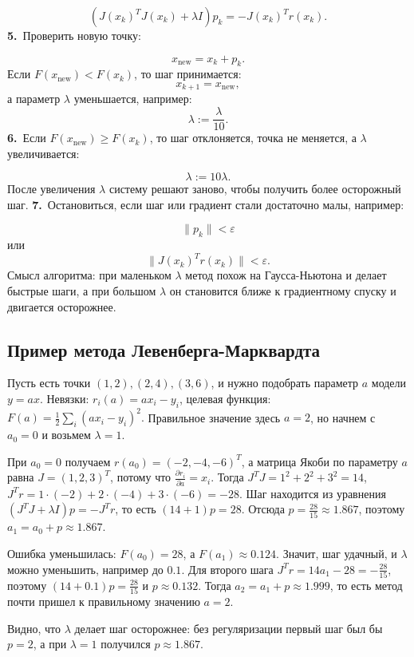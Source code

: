 \documentclass[12pt,a4paper]{article}
\begin{document}
\[
\left(J(x_k)^TJ(x_k)+\lambda I\right)p_k=-J(x_k)^Tr(x_k).
\]
\noindent\textbf{5.}\ Проверить новую точку:\par
\[
x_{\text{new}}=x_k+p_k.
\]
Если $F(x_{\text{new}})<F(x_k)$, то шаг принимается:
\[
x_{k+1}=x_{\text{new}},
\]
а параметр $\lambda$ уменьшается, например:
\[
\lambda:=\frac{\lambda}{10}.
\]
\noindent\textbf{6.}\ Если $F(x_{\text{new}})\ge F(x_k)$, то шаг отклоняется, точка не меняется, а $\lambda$ увеличивается:\par
\[
\lambda:=10\lambda.
\]
После увеличения $\lambda$ систему решают заново, чтобы получить более осторожный шаг.
\noindent\textbf{7.}\ Остановиться, если шаг или градиент стали достаточно малы, например:\par
\[
\|p_k\|<\varepsilon
\]
или
\[
\|J(x_k)^Tr(x_k)\|<\varepsilon.
\]
Смысл алгоритма: при маленьком $\lambda$ метод похож на Гаусса-Ньютона и делает быстрые шаги, а при большом $\lambda$ он становится ближе к градиентному спуску и двигается осторожнее.
\subsection{Пример метода Левенберга-Марквардта}
Пусть есть точки $(1,2),(2,4),(3,6)$, и нужно подобрать параметр $a$ модели $y=ax$.
Невязки: $r_i(a)=ax_i-y_i$, целевая функция: $F(a)=\frac12\sum_i(ax_i-y_i)^2.$
Правильное значение здесь $a=2$, но начнем с $a_0=0$ и возьмем $\lambda=1$.

При $a_0=0$ получаем $r(a_0)=(-2,-4,-6)^T$, а матрица Якоби по параметру $a$ равна $J=(1,2,3)^T$, потому что $\frac{\partial r_i}{\partial a}=x_i.$
Тогда $J^TJ=1^2+2^2+3^2=14$, $J^Tr=1\cdot(-2)+2\cdot(-4)+3\cdot(-6)=-28.$
Шаг находится из уравнения $(J^TJ+\lambda I)p=-J^Tr$, то есть $(14+1)p=28.$
Отсюда $p=\frac{28}{15}\approx 1.867$, поэтому $a_1=a_0+p\approx 1.867.$

Ошибка уменьшилась: $F(a_0)=28$, а $F(a_1)\approx 0.124.$
Значит, шаг удачный, и $\lambda$ можно уменьшить, например до $0.1$.
Для второго шага $J^Tr=14a_1-28=-\frac{28}{15}$, поэтому $(14+0.1)p=\frac{28}{15}$ и $p\approx 0.132.$
Тогда $a_2=a_1+p\approx 1.999$, то есть метод почти пришел к правильному значению $a=2$.

Видно, что $\lambda$ делает шаг осторожнее: без регуляризации первый шаг был бы $p=2$, а при $\lambda=1$ получился $p\approx 1.867$.
\end{document}
